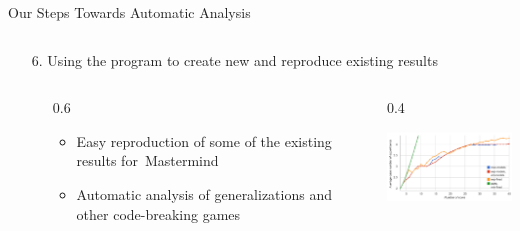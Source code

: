 \documentclass[final]{beamer}
\newcommand{\thando}[4]{
\begin{columns}[T]
\begin{column}{\leftmarginii}
\end{column}
\begin{column}{#3\textwidth}
\vspace{-1.5mm}
\begin{itemize}
#1
\end{itemize}
\end{column}
\begin{column}{#4\textwidth}
#2
\end{column}
\end{columns}\medskip}
\begin{document}
\begin{frame}{}
\begin{block}{Our Steps Towards Automatic Analysis}
\begin{columns}[T]
\begin{column}{0.48\textwidth}
\begin{enumerate}
{        }{0.95}{0.05}
      \item[6.] Using the program to create new and reproduce existing results
        \thando{
        \item Easy reproduction of some of the existing results for~Mastermind
        \item Automatic analysis of generalizations and \\other code-breaking games
        }{
          \includegraphics[width=4.5cm]{img-results.png}
        }{0.6}{0.4}
        \end{enumerate}
        \vspace{-3ex}~
      \end{column}
      \end{columns}
    \end{block}       
\vfill
\end{frame}
\end{document}
